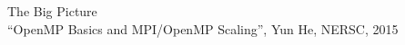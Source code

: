 


\begin{frame}{The Big Picture}
   \\
  {\scriptsize ``OpenMP Basics and MPI/OpenMP Scaling'', Yun He, NERSC, 2015}  
\end{frame}

